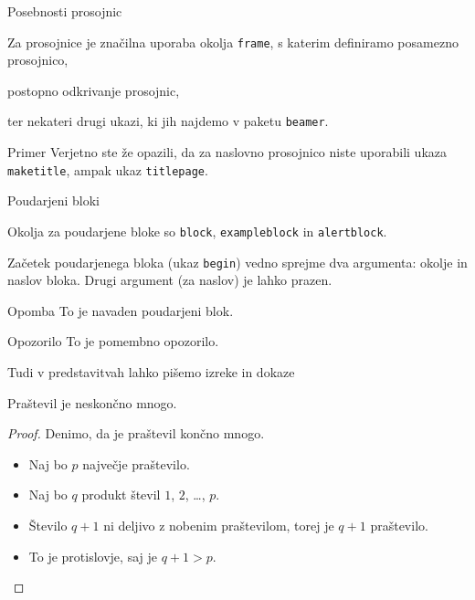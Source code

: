 \begin{frame}{Posebnosti prosojnic}

	Za prosojnice je značilna uporaba okolja \texttt{frame},
s katerim definiramo posamezno prosojnico,

\pause

postopno odkrivanje prosojnic,

\pause

ter nekateri drugi ukazi, ki jih najdemo v paketu \texttt{beamer}.
	\begin{exampleblock}{Primer}
		Verjetno ste že opazili, da za naslovno prosojnico niste uporabili
		ukaza \texttt{maketitle}, ampak ukaz \texttt{titlepage}.
	\end{exampleblock}
\end{frame}

\begin{frame}{Poudarjeni bloki}

		Okolja za poudarjene bloke so \texttt{block}, \texttt{exampleblock} in \texttt{alertblock}.

		Začetek poudarjenega bloka (ukaz \texttt{begin}) vedno sprejme 
		dva argumenta: okolje in naslov bloka.
		Drugi argument (za naslov) je lahko prazen. 
\begin{block}{Opomba}
To je navaden poudarjeni blok.
\end{block}

\begin{alertblock}{Opozorilo}
To je pomembno opozorilo.
\end{alertblock}
\end{frame}

\begin{frame}{Tudi v predstavitvah lahko pišemo izreke in dokaze}

	\begin{izrek}
	   Praštevil je neskončno mnogo.
	\end{izrek}
	\begin{proof}
	   Denimo, da je praštevil končno mnogo.
	   \begin{itemize}[<+->]
		  \item Naj bo \(p\) \alert<4>{največje} praštevilo.
		  \item Naj bo \(q\) produkt števil \(1\), \(2\), \ldots, \(p\).
		  \item Število \(q+1\) ni deljivo z nobenim praštevilom, torej je \(q+1\) praštevilo.
		  \item To je protislovje, saj je \(q+1>p\). \qedhere
	   \end{itemize}
	\end{proof}
 \end{frame}
 
